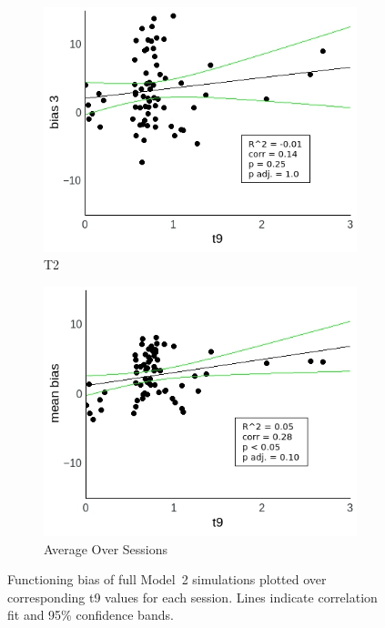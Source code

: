 \documentclass[a4paper]{scrreprt}
\begin{document}
\begin{figure}
\begin{subfigure}[b]{0.49\textwidth}
        \includegraphics[width=\textwidth]{figs/sec3/t9/t9_diff_3_mod2mod2.jpeg}
        \caption{T2}
    \end{subfigure}
    \begin{subfigure}[b]{0.49\textwidth}
        \includegraphics[width=\textwidth]{figs/sec3/t9/t9_diff_mean_mod2mod2.jpeg}
        \caption{Average Over Sessions}
    \end{subfigure}
\caption{Functioning bias of full Model~2 simulations plotted over corresponding t9 values for each session. Lines indicate correlation fit and 95\% confidence bands.}
\label{fig:t9_diff_mod2mod2}
\end{figure}
\end{document}
